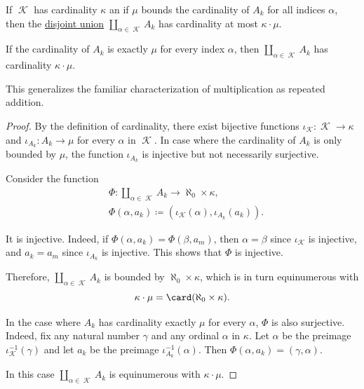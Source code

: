 \begin{proposition}\label{thm:cardinality_of_disjoint_union}
  If \( \mscrK \) has cardinality \( \kappa \) an if \( \mu \) bounds the cardinality of \( A_k \) for all indices \( \alpha \), then the \hyperref[def:disjoint_union]{disjoint union} \( \coprod_{\alpha \in \mscrK} A_k \) has cardinality at most \( \kappa \cdot \mu \).

  If the cardinality of \( A_k \) is exactly \( \mu \) for every index \( \alpha \), then \( \coprod_{\alpha \in \mscrK} A_k \) has cardinality \( \kappa \cdot \mu \).
\end{proposition}
\begin{comments}
  \item This generalizes the familiar characterization of multiplication as repeated addition.
\end{comments}
\begin{proof}
  By the definition of cardinality, there exist bijective functions \( \iota_\mscrK: \mscrK \to \kappa \) and \( \iota_{A_k}: A_k \to \mu \) for every \( \alpha \) in \( \mscrK \). In case where the cardinality of \( A_k \) is only bounded by \( \mu \), the function \( \iota_{A_k} \) is injective but not necessarily surjective.

  Consider the function
  \begin{equation*}
    \begin{aligned}
      &\Phi:\coprod_{\alpha \in \mscrK} A_k \to \aleph_0 \times \kappa, \\
      &\Phi(\alpha, a_k) \coloneqq (\iota_\mscrK(\alpha), \iota_{A_k}(a_k)).
    \end{aligned}
  \end{equation*}

  It is injective. Indeed, if \( \Phi(\alpha, a_k) = \Phi(\beta, a_m) \), then \( \alpha = \beta \) since \( \iota_\mscrK \) is injective, and \( a_k = a_m \) since \( \iota_{A_k} \) is injective. This shows that \( \Phi \) is injective.

  Therefore, \( \coprod_{\alpha \in \mscrK} A_k \) is bounded by \( \aleph_0 \times \kappa \), which is in turn equinumerous with
  \begin{equation*}
    \kappa \cdot \mu = \card(\aleph_0 \times \kappa).
  \end{equation*}

  In the case where \( A_k \) has cardinality exactly \( \mu \) for every \( \alpha \), \( \Phi \) is also surjective. Indeed, fix any natural number \( \gamma \) and any ordinal \( \alpha \) in \( \kappa \). Let \( \alpha \) be the preimage \( \iota_\mscrK^{-1}(\gamma) \) and let \( a_k \) be the preimage \( \iota_{A_k}^{-1}(\alpha) \). Then \( \Phi(\alpha, a_k) = (\gamma, \alpha) \).

  In this case \( \coprod_{\alpha \in \mscrK} A_k \) is equinumerous with \( \kappa \cdot \mu \).
\end{proof}

